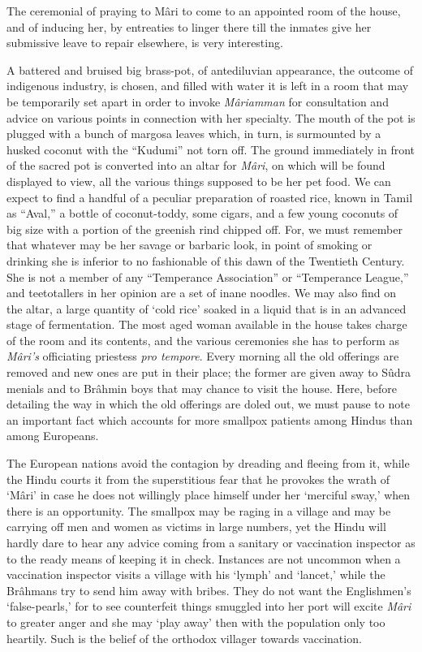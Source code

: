 \documentclass[a4paper, 12pt, oneside, english]{article}
\begin{document}
The ceremonial of praying to Mâri to come to an appointed room of the house, and of inducing her, by entreaties to linger there till the inmates give her submissive leave to repair elsewhere, is very interesting.

A battered and bruised big brass-pot, of antediluvian appearance, the outcome of indigenous industry, is chosen, and filled with water it is left in a room that may be temporarily set apart in order to invoke \emph{Mâriamman} for consultation and advice on various points in connection with her specialty. The mouth of the pot is plugged with a bunch of margosa leaves which, in turn, is surmounted by a husked coconut with the ``Kudumi'' not torn off. The ground immediately in front of the sacred pot is converted into an altar for \emph{Mâri}, on which will be found displayed to view, all the various things supposed to be her pet food. We can expect to find a handful of a peculiar preparation of roasted rice, known in Tamil as ``Aval,'' a bottle of coconut-toddy, some cigars, and a few young coconuts of big size with a portion of the greenish rind chipped off. For, we must remember that whatever may be her savage or barbaric look, in point of smoking or drinking she is inferior to no fashionable of this dawn of the Twentieth Century. She is not a member of any ``Temperance Association'' or ``Temperance League,'' and teetotallers in her opinion are a set of inane noodles. We may also find on the altar, a large quantity of `cold rice' soaked in a liquid that is in an advanced stage of fermentation. The most aged woman available in the house takes charge of the room and its contents, and the various ceremonies she has to perform as \emph{Mâri's} officiating priestess \emph{pro tempore}. Every morning all the old offerings are removed and new ones are put in their place; the former are given away to Sûdra menials and to Brâhmin boys that may chance to visit the house. Here, before detailing the way in which the old offerings are doled out, we must pause to note an important fact which accounts for more smallpox patients among Hindus than among Europeans.

The European nations avoid the contagion by dreading and fleeing from it, while the Hindu courts it from the superstitious fear that he provokes the wrath of `Mâri' in case he does not willingly place himself under her `merciful sway,' when there is an opportunity. The smallpox may be raging in a village and may be carrying off men and women as victims in large numbers, yet the Hindu will hardly dare to hear any advice coming from a sanitary or vaccination inspector as to the ready means of keeping it in check. Instances are not uncommon when a vaccination inspector visits a village with his `lymph' and `lancet,' while the Brâhmans try to send him away with bribes. They do not want the Englishmen's `false-pearls,' for to see counterfeit things smuggled into her port will excite \emph{Mâri} to greater anger and she may `play away' then with the population only too heartily. Such is the belief of the orthodox villager towards vaccination.
\end{document}

